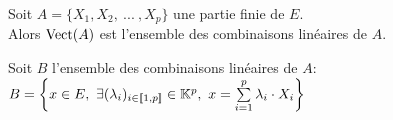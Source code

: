 \documentclass[12pt,twoside,a4paper]{article}
\begin{document}
		\begin{prop}
			Soit $A=\{X_1,X_2,\ ...\ ,X_p \}$ une partie finie de $E$.\\
			Alors $\text{Vect}(A)$ est l'ensemble des combinaisons linéaires de $A$.
		\end{prop}
		\begin{preuve}
			Soit $B$ l'ensemble des combinaisons linéaires de $A$:\\
			$B=\left\lbrace x\in E,\ \exists (\lambda_i)_{i\in\lbracket1,p\rbracket}\in\K^{p},\ x=\sum\limits_{i=1}^{p}\lambda_i \cdot X_i\right\rbrace $
		\end{preuve}
\end{document}

